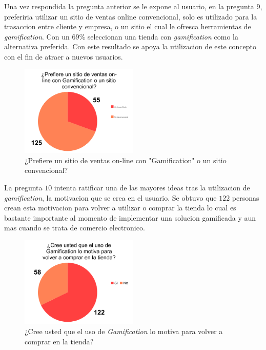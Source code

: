 Una vez respondida la pregunta anterior se le expone al usuario, en la pregunta $9$,  preferiria
utilizar un sitio de ventas online convencional, solo es utilizado para la trasaccion entre cliente
y empresa, o un sitio el cual le ofresca herramientas de \emph{gamification}. Con un $69\%$ seleccionan
una tienda con \emph{gamification} como la alternativa preferida. Con este resultado se apoya la
utilizacion de este concepto con el fin de atraer a nuevos usuarios.

\begin{figure}[!htb]
  \centering
  \includegraphics[width=0.5\textwidth]{images/chartPreg9.png}
  \caption[chart9]{¿Prefiere un sitio de ventas on-line con "Gamification" o un sitio convencional?}
  \label{fig:chart2}
\end{figure}

La pregunta $10$ intenta ratificar una de las mayores ideas tras la utilizacion de \emph{gamification},
la motivacion que se crea en el usuario. Se obtuvo que $122$ personas crean esta motivacion
para volver a utilizar o comprar la tienda lo cual es bastante importante al momento de implementar
una solucion gamificada y aun mas cuando se trata de comercio electronico.

\begin{figure}[!htb]
  \centering
  \includegraphics[width=0.5\textwidth]{images/chartPreg10.png}
  \caption[chart10]{¿Cree usted que el uso de \emph{Gamification} lo motiva para volver a comprar en la tienda?}
  \label{fig:chart2}
\end{figure}

